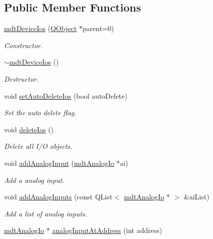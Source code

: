 \subsection*{Public Member Functions}
\begin{DoxyCompactItemize}
\item 
\hyperlink{classmdt_device_ios_a44939a10d66421069bdd4b8717e2798c}{mdt\-Device\-Ios} (\hyperlink{class_q_object}{Q\-Object} $\ast$parent=0)
\begin{DoxyCompactList}\small\item\em Constructor. \end{DoxyCompactList}\item 
\hyperlink{classmdt_device_ios_a8e1e02aeecd2617a8696ba625192bd19}{$\sim$mdt\-Device\-Ios} ()
\begin{DoxyCompactList}\small\item\em Destructor. \end{DoxyCompactList}\item 
void \hyperlink{classmdt_device_ios_af771f8080ce4a7260baa0acccacae0e1}{set\-Auto\-Delete\-Ios} (bool auto\-Delete)
\begin{DoxyCompactList}\small\item\em Set the auto delete flag. \end{DoxyCompactList}\item 
void \hyperlink{classmdt_device_ios_a272fc1fa86e1b66e6af0e58b130939e0}{delete\-Ios} ()
\begin{DoxyCompactList}\small\item\em Delete all I/\-O objects. \end{DoxyCompactList}\item 
void \hyperlink{classmdt_device_ios_a0e2683630eff9410003a36ae5af76b52}{add\-Analog\-Input} (\hyperlink{classmdt_analog_io}{mdt\-Analog\-Io} $\ast$ai)
\begin{DoxyCompactList}\small\item\em Add a analog input. \end{DoxyCompactList}\item 
void \hyperlink{classmdt_device_ios_a776dc0508f88f8ea206801fc7472bfb2}{add\-Analog\-Inputs} (const Q\-List$<$ \hyperlink{classmdt_analog_io}{mdt\-Analog\-Io} $\ast$ $>$ \&ai\-List)
\begin{DoxyCompactList}\small\item\em Add a list of analog inputs. \end{DoxyCompactList}\item 
\hyperlink{classmdt_analog_io}{mdt\-Analog\-Io} $\ast$ \hyperlink{classmdt_device_ios_ad74dc114cec2029aa9a14714f13666c7}{analog\-Input\-At\-Address} (int address)

\end{DoxyCompactItemize}
